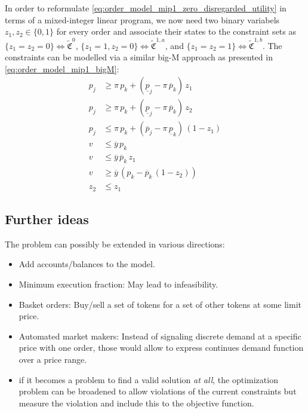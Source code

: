 \documentclass[11pt,parskip=full]{scrartcl}%
\newcommand*{\Min}{\mathrm{min}}
\begin{document}
In order to reformulate \eqref{eq:order_model_mip1_zero_disregarded_utility} in terms of a mixed-integer linear program, we now need two binary variabels $z_1, z_2 \in \{0,1\}$ for every order and associate their states to the constraint sets as $\{z_1 = z_2 = 0\} \Leftrightarrow \tilde{\mathfrak{C}}^0$, $\{z_1 = 1, z_2 = 0\} \Leftrightarrow \tilde{\mathfrak{C}}^{1,a}$, and $\{z_1 = z_2 = 1\} \Leftrightarrow \tilde{\mathfrak{C}}^{1,b}$.
The constraints can be modelled via a similar big-M approach as presented in \eqref{eq:order_model_mip1_bigM}:
\begin{subequations}
\begin{align}
  p_j &\ge \pi \, p_k
    + (\underline{p}_j - \pi \, \overline{p}_k) \, z_1 \\[1mm]
  p_j &\ge \pi \, p_k
    + (\underline{p}_j - \pi \, \overline{p}_k) \, z_2 \\[1mm]
  p_j &\le \pi \, p_k
    + (\overline{p}_j - \pi \, \underline{p}_k) \, (1-z_1) \\[1mm]
  v &\le \overline{y} \, p_k \\[1mm]
  v &\le \overline{y} \, \overline{p}_k \, z_1 \\[1mm]
  v &\ge \overline{y} \, (p_k - \overline{p}_k \, (1-z_2)) \\[1mm]
  z_2 &\le z_1
\end{align}
\label{eq:order_model_mip1_bigM}
\end{subequations}

\newpage
\subsection{Further ideas}

The problem can possibly be extended in various directions:
\begin{itemize}
  \item Add accounts/balances to the model.
  \item Minimum execution fraction: May lead to infeasibility.
  \item Basket orders: Buy/sell a set of tokens for a set of other tokens at some limit price.
  \item Automated market makers: Instead of signaling discrete demand at a specific price with one
  order, those would allow to express continues demand function over a price range.
  \item if it becomes a problem to find a valid solution \emph{at all}, the optimization problem can
  be broadened to allow violations of the current constraints but measure the violation and
  include this to the objective function.
\end{itemize}







\newpage


\end{document}
